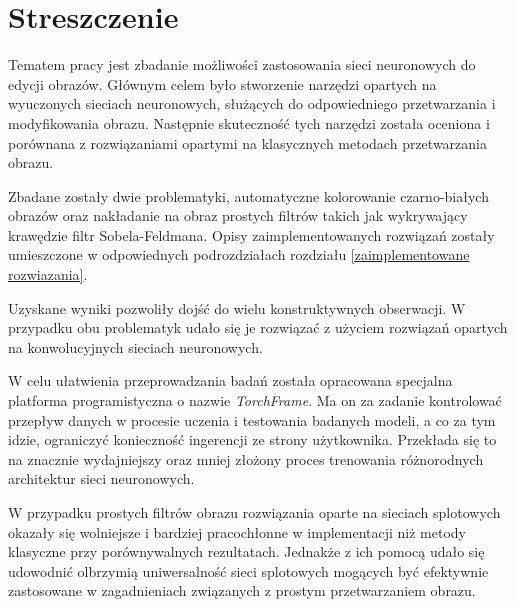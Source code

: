 \section*{Streszczenie}

  Tematem pracy jest zbadanie możliwości zastosowania sieci neuronowych do
  edycji obrazów. Głównym celem było stworzenie narzędzi opartych na wyuczonych
  sieciach neuronowych, służących do odpowiedniego przetwarzania i
  modyfikowania obrazu. Następnie skuteczność tych narzędzi została oceniona i
  porównana z rozwiązaniami opartymi na klasycznych metodach przetwarzania obrazu.

  Zbadane zostały dwie problematyki, automatyczne kolorowanie czarno-białych obrazów
  oraz nakładanie na obraz prostych filtrów takich jak wykrywający
  krawędzie filtr Sobela-Feldmana. Opisy zaimplementowanych rozwiązań zostały
  umieszczone w odpowiednych podrozdziałach
  rozdziału \ref{zaimplementowane rozwiazania}.

  Uzyskane wyniki pozwoliły dojść do wielu konstruktywnych obserwacji. W przypadku obu
  problematyk udało się je rozwiązać z użyciem rozwiązań opartych na konwolucyjnych
  sieciach neuronowych.

  W celu ułatwienia przeprowadzania badań została opracowana specjalna platforma
  programistyczna o nazwie \textit{TorchFrame}. Ma on za zadanie kontrolować
  przepływ danych w procesie uczenia i testowania badanych modeli, a co za tym
  idzie, ograniczyć konieczność ingerencji ze strony użytkownika. Przekłada
  się to na znacznie wydajniejszy oraz mniej złożony proces trenowania
  różnorodnych architektur sieci neuronowych.

  W przypadku prostych filtrów obrazu rozwiązania
  oparte na sieciach splotowych okazały się wolniejsze i bardziej pracochłonne w
  implementacji niż metody klasyczne przy porównywalnych rezultatach. Jednakże
  z ich pomocą udało się udowodnić olbrzymią uniwersalność sieci splotowych
  mogących być efektywnie zastosowane w zagadnieniach związanych z prostym
  przetwarzaniem obrazu.

